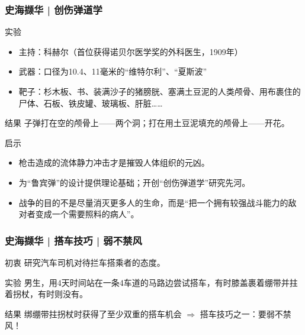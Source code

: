 \begin{frame}
  \frametitle{史海撷华 | 创伤弹道学}
  \begin{block}{实验}
    \begin{itemize}
      \item 主持：科赫尔（首位获得诺贝尔医学奖的外科医生，1909年）
      \item 武器：口径为10.4、11毫米的“维特尔利”、“夏斯波”
      \item 靶子：杉木板、书、装满沙子的猪膀胱、塞满土豆泥的人类颅骨、用布裹住的尸体、石板、铁皮罐、玻璃板、肝脏……
    \end{itemize}
  \end{block}
  \vspace{-0.3em}
  \pause
  \begin{block}{结果}
     子弹打在空的颅骨上——两个洞；打在用土豆泥填充的颅骨上——开花。
  \end{block}
  \vspace{-0.3em}
  \pause
  \begin{block}{启示}
    \begin{itemize}
      \item 枪击造成的流体静力冲击才是摧毁人体组织的元凶。
      \item 为“鲁宾弹”的设计提供理论基础；开创“创伤弹道学”研究先河。
      \item 战争的目的不是尽量消灭更多人的生命，而是“把一个拥有较强战斗能力的敌对者变成一个需要照料的病人”。
    \end{itemize}
  \end{block}
\end{frame}

\begin{frame}
  \frametitle{史海撷华 | 搭车技巧 | 弱不禁风}
  \begin{block}{初衷}
    研究汽车司机对待拦车搭乘者的态度。
  \end{block}
  \pause
  \begin{block}{实验}
    男生，用4天时间站在一条4车道的马路边尝试搭车，有时膝盖裹着绷带并拄着拐杖，有时则没有。
  \end{block}
  \pause
  \begin{block}{结果}
    绑绷带拄拐杖时获得了至少双重的搭车机会 $\Longrightarrow$ 搭车技巧之一：要弱不禁风！
  \end{block}
\end{frame}

